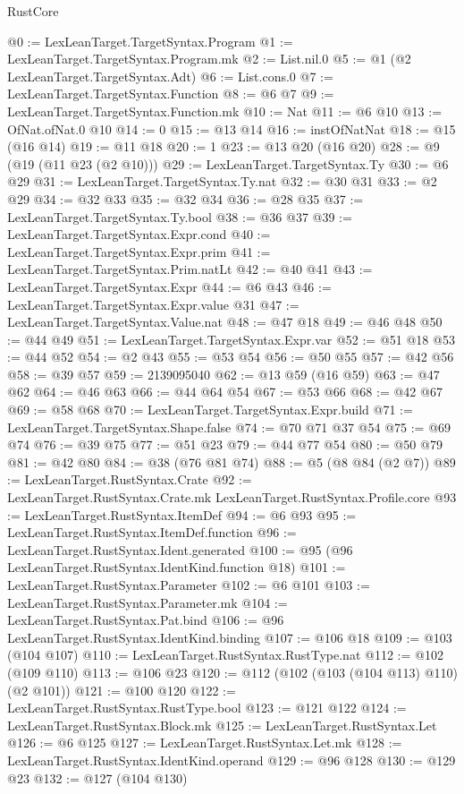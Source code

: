 \begin{lexlean}{RustCore}
\begin{coremodule}
@0 := LexLeanTarget.TargetSyntax.Program
@1 := LexLeanTarget.TargetSyntax.Program.mk
@2 := List.nil.{0}
@5 := @1 (@2 LexLeanTarget.TargetSyntax.Adt)
@6 := List.cons.{0}
@7 := LexLeanTarget.TargetSyntax.Function
@8 := @6 @7
@9 := LexLeanTarget.TargetSyntax.Function.mk
@10 := Nat
@11 := @6 @10
@13 := OfNat.ofNat.{0} @10
@14 := 0
@15 := @13 @14
@16 := instOfNatNat
@18 := @15 (@16 @14)
@19 := @11 @18
@20 := 1
@23 := @13 @20 (@16 @20)
@28 := @9 (@19 (@11 @23 (@2 @10)))
@29 := LexLeanTarget.TargetSyntax.Ty
@30 := @6 @29
@31 := LexLeanTarget.TargetSyntax.Ty.nat
@32 := @30 @31
@33 := @2 @29
@34 := @32 @33
@35 := @32 @34
@36 := @28 @35
@37 := LexLeanTarget.TargetSyntax.Ty.bool
@38 := @36 @37
@39 := LexLeanTarget.TargetSyntax.Expr.cond
@40 := LexLeanTarget.TargetSyntax.Expr.prim
@41 := LexLeanTarget.TargetSyntax.Prim.natLt
@42 := @40 @41
@43 := LexLeanTarget.TargetSyntax.Expr
@44 := @6 @43
@46 := LexLeanTarget.TargetSyntax.Expr.value @31
@47 := LexLeanTarget.TargetSyntax.Value.nat
@48 := @47 @18
@49 := @46 @48
@50 := @44 @49
@51 := LexLeanTarget.TargetSyntax.Expr.var
@52 := @51 @18
@53 := @44 @52
@54 := @2 @43
@55 := @53 @54
@56 := @50 @55
@57 := @42 @56
@58 := @39 @57
@59 := 2139095040
@62 := @13 @59 (@16 @59)
@63 := @47 @62
@64 := @46 @63
@66 := @44 @64 @54
@67 := @53 @66
@68 := @42 @67
@69 := @58 @68
@70 := LexLeanTarget.TargetSyntax.Expr.build
@71 := LexLeanTarget.TargetSyntax.Shape.false
@74 := @70 @71 @37 @54
@75 := @69 @74
@76 := @39 @75
@77 := @51 @23
@79 := @44 @77 @54
@80 := @50 @79
@81 := @42 @80
@84 := @38 (@76 @81 @74)
@88 := @5 (@8 @84 (@2 @7))
@89 := LexLeanTarget.RustSyntax.Crate
@92 := LexLeanTarget.RustSyntax.Crate.mk LexLeanTarget.RustSyntax.Profile.core
@93 := LexLeanTarget.RustSyntax.ItemDef
@94 := @6 @93
@95 := LexLeanTarget.RustSyntax.ItemDef.function
@96 := LexLeanTarget.RustSyntax.Ident.generated
@100 := @95 (@96 LexLeanTarget.RustSyntax.IdentKind.function @18)
@101 := LexLeanTarget.RustSyntax.Parameter
@102 := @6 @101
@103 := LexLeanTarget.RustSyntax.Parameter.mk
@104 := LexLeanTarget.RustSyntax.Pat.bind
@106 := @96 LexLeanTarget.RustSyntax.IdentKind.binding
@107 := @106 @18
@109 := @103 (@104 @107)
@110 := LexLeanTarget.RustSyntax.RustType.nat
@112 := @102 (@109 @110)
@113 := @106 @23
@120 := @112 (@102 (@103 (@104 @113) @110) (@2 @101))
@121 := @100 @120
@122 := LexLeanTarget.RustSyntax.RustType.bool
@123 := @121 @122
@124 := LexLeanTarget.RustSyntax.Block.mk
@125 := LexLeanTarget.RustSyntax.Let
@126 := @6 @125
@127 := LexLeanTarget.RustSyntax.Let.mk
@128 := LexLeanTarget.RustSyntax.IdentKind.operand
@129 := @96 @128
@130 := @129 @23
@132 := @127 (@104 @130)

\end{coremodule}
\end{lexlean}
